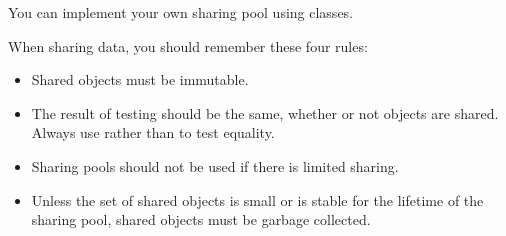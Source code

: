 You can implement your own sharing pool using  classes.

When sharing data, you should remember these four rules:
\begin{itemize}
  \item Shared objects must be immutable.
  \item The result of  testing should be the same, whether or
not objects are shared.  Always use  rather than \code{==} to
test equality.
  \item Sharing pools should not be used if there is limited sharing.
  \item Unless the set of shared objects is small or is stable for
  the lifetime of the sharing pool, shared objects must be garbage
  collected.
\end{itemize}





